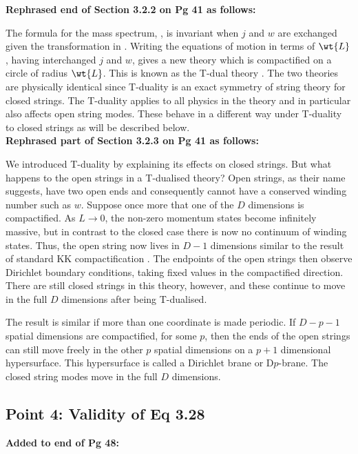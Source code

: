 \textbf{Rephrased end of Section 3.2.2 on Pg 41 as follows:}

The formula for the mass spectrum, , is invariant
when $j$ and $w$ are exchanged given the transformation in .
Writing the equations of motion in terms of $\wt{L}$, having interchanged $j$ and
$w$, gives a new theory which is compactified on a circle of radius $\wt{L}$. This is known as the
T-dual theory \cite{Sakai1986,Kikkawa1984b}. The two
theories are physically identical since T-duality is an exact symmetry
of string theory for closed strings. The T-duality applies to all physics in the theory and in
particular also affects open string modes. These behave in a different way under T-duality to closed
strings as will be described below.
\\

\textbf{Rephrased part of Section 3.2.3 on Pg 41 as follows:}

We introduced T-duality by explaining
its effects on closed strings. But what happens to the open strings in a T-dualised theory? Open
strings, as their name suggests, have two open ends and
consequently cannot have a conserved winding number such as $w$. Suppose once more
that one
of the $D$ dimensions is compactified. As $L\rightarrow0$, the non-zero momentum
states become infinitely massive, but in contrast to the closed case there is now
no continuum of winding states. Thus, the open string now lives in $D-1$ dimensions
similar to the result of standard KK compactification \cite{Johnson2000}.
The endpoints of the open strings 
then observe Dirichlet boundary conditions, taking fixed values in the compactified
direction.
There are still closed strings in this theory, however, and these continue to
move in the full $D$ dimensions after being T-dualised.  

The result is similar if more than
one coordinate is made periodic.
If $D-p-1$ spatial dimensions are compactified, for some $p$, then the ends of
the open
strings can still move freely in the other $p$ spatial dimensions on a $p+1$
dimensional hypersurface. This hypersurface is called a Dirichlet brane or
D$p$-brane. The closed string modes move in the full $D$ dimensions.



\subsection{Point 4: Validity of Eq 3.28}
\textbf{Added to end of Pg 48:}

